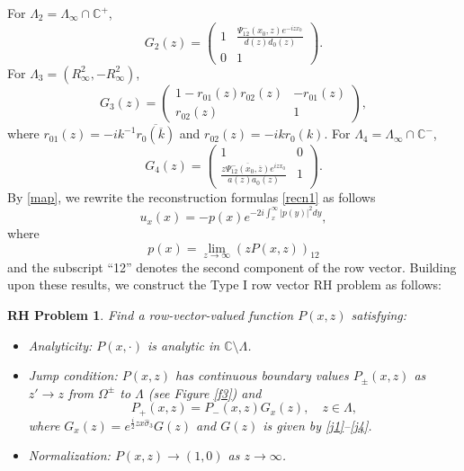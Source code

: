 \documentclass[preprint,compress,12pt]{elsarticle}
\newtheorem{rhp}{RH Problem}
\numberwithin{equation}{section}
\begin{document}
For $\Lambda_{2}=\Lambda_{\infty}\cap\mathbb{C}^{+}$,
       \begin{equation}\label{j2}
       G_{2}(z)=\begin{pmatrix}1&\frac{\Psi_{12}^{-}(x_{0},z)e^{-izx_{0}}}{d(z)d_{0}(z)}\\0&1
       \end{pmatrix}.
       \end{equation}
For $\Lambda_{3}=(R_{\infty}^{2},-R_{\infty}^{2})$,
       \begin{equation}\label{j3}
       G_{3}(z)=\begin{pmatrix}1-r_{01}(z)r_{02}(z)&-r_{01}(z)\\r_{02}(z)&1
       \end{pmatrix},
       \end{equation}
       where $r_{01}(z)=-ik^{-1}\overline{r_{0}(\overline{k})}$ and $r_{02}(z)=-ikr_{0}(k)$.
For $\Lambda_{4}=\Lambda_{\infty}\cap \mathbb{C}^{-}$,
       \begin{equation}\label{j4}
       G_{4}(z)=\begin{pmatrix}1&0\\ \frac{z\overline{\Psi_{12}^{-}(x_{0},\overline{z})}e^{izx_{0}}}{a(z)a_{0}(z)}&1
        \end{pmatrix}.
       \end{equation}
By \eqref{map}, we rewrite the reconstruction formulas \eqref{recn1} as follows
\begin{equation}\label{recp1}
u_{x}(x)=-p(x)e^{-2i\int_{x}^{\infty}|p(y)|^{2}dy},
\end{equation}
where
\begin{equation}\label{px}
p(x)=\lim\limits_{z\rightarrow\infty}\left(zP\left(x,z\right)\right)_{12}
\end{equation}
and the subscript ``12'' denotes the second component of the row vector. Building upon these results, we construct the Type I row vector RH problem as follows:
\begin{rhp}\label{RH2}
Find a row-vector-valued function $P(x,z)$ satisfying:
\begin{itemize}
  \item Analyticity: $P(x,\cdot)$ is analytic in $\mathbb{C}\setminus\Lambda$.
  \item Jump condition: $P(x,z)$ has continuous boundary values $P_{\pm}(x,z)$ as $z'\rightarrow z$ from $\Omega^{\pm}$ to $\Lambda$ (see Figure \ref{f3}) and
      \begin{equation}
      P_{+}(x,z)=P_{-}(x,z)G_{x}(z),\quad z\in\Lambda,
      \end{equation}
      where $G_{x}(z)=e^{\frac{i}{2}zx\widehat{\sigma}_{3}}G(z)$ and $G(z)$ is given by \eqref{j1}--\eqref{j4}.
  \item Normalization: $P(x,z)\rightarrow (1,0)$ as $z\rightarrow\infty$.
\end{itemize}
\end{rhp}
\end{document}
